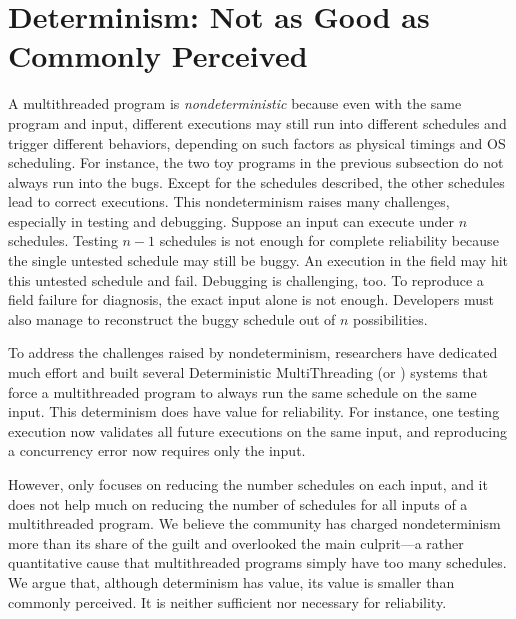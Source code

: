 


\section{Determinism: Not as Good as Commonly Perceived} \label{sec:smt-dmt}

A multithreaded program is \emph{nondeterministic} because even with the same
program and input, different executions may still run into different schedules
and trigger different behaviors, depending on such factors as physical timings
and OS scheduling. For instance, the two toy programs in the previous subsection
do not always run into the bugs.  Except for the schedules described, the
other schedules lead to correct executions. This nondeterminism raises many
challenges, especially in testing and debugging.  Suppose an input can execute
under $n$ schedules. Testing $n-1$ schedules is not enough for complete
reliability because the single untested schedule may still be buggy.  An
execution in the field may hit this untested schedule and fail.  Debugging is
challenging, too. To reproduce a field failure for diagnosis, the exact input
alone is not enough. Developers must also manage to reconstruct the buggy
schedule out of $n$ possibilities.

To address the challenges raised by nondeterminism, researchers have dedicated
much effort and built several Deterministic MultiThreading (or \dmt) systems
that force a multithreaded program to always run the same schedule on the same
input.  This determinism does have value for reliability.  For instance, one
testing execution now validates all future executions on the same input, and 
reproducing a concurrency error now requires only the input.

However, \dmt only focuses on reducing the number schedules on each input, and it does not help much on reducing the number of schedules for all inputs of a multithreaded program.  We believe
the community has charged nondeterminism more than its share of the guilt
and overlooked the main culprit---a rather quantitative cause that
multithreaded programs simply have too many schedules.
We argue that, although determinism has value, its value
is smaller than commonly perceived.  It is neither sufficient nor
necessary for reliability.

